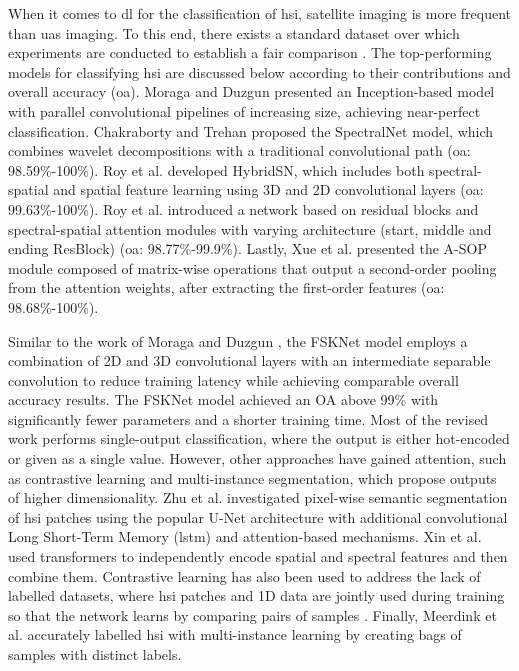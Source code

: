 When it comes to \acrshort{dl} for the classification of \acrshort{hsi}, satellite imaging is more frequent than \acrshort{uas} imaging. To this end, there exists a standard dataset over which experiments are conducted to establish a fair comparison \cite{m_grana_hyperspectral_nodate}. The top-performing models for classifying \acrshort{hsi} are discussed below according to their contributions and overall accuracy (\acrshort{oa}). Moraga and Duzgun \cite{moraga_jigsawhsi_2022} presented an Inception-based model with parallel convolutional pipelines of increasing size, achieving near-perfect classification. Chakraborty and Trehan \cite{chakraborty_spectralnet_2021} proposed the SpectralNet model, which combines wavelet decompositions with a traditional convolutional path (\acrshort{oa}: 98.59\%-100\%). Roy et al. \cite{roy_hybridsn_2020} developed HybridSN, which includes both spectral-spatial and spatial feature learning using 3D and 2D convolutional layers (\acrshort{oa}: 99.63\%-100\%). Roy et al. \cite{roy_attention-based_2021} introduced a network based on residual blocks and spectral-spatial attention modules with varying architecture (start, middle and ending ResBlock) (\acrshort{oa}: 98.77\%-99.9\%). Lastly, Xue et al. \cite{xue_attention-based_2021} presented the A-SOP module composed of matrix-wise operations that output a second-order pooling from the attention weights, after extracting the first-order features (\acrshort{oa}: 98.68\%-100\%). 

Similar to the work of Moraga and Duzgun \cite{moraga_jigsawhsi_2022}, the FSKNet model employs a combination of 2D and 3D convolutional layers with an intermediate separable convolution to reduce training latency while achieving comparable overall accuracy results. The FSKNet model achieved an OA above 99\% with significantly fewer parameters and a shorter training time. Most of the revised work performs single-output classification, where the output is either hot-encoded or given as a single value. However, other approaches have gained attention, such as contrastive learning and multi-instance segmentation, which propose outputs of higher dimensionality. Zhu et al. \cite{zhu_spectral-spatial-dependent_2021} investigated pixel-wise semantic segmentation of \acrshort{hsi} patches using the popular U-Net architecture with additional convolutional Long Short-Term Memory (\acrshort{lstm}) and attention-based mechanisms. Xin et al. \cite{xin_convolution_2022} used transformers to independently encode spatial and spectral features and then combine them. Contrastive learning has also been used to address the lack of labelled datasets, where \acrshort{hsi} patches and 1D data are jointly used during training so that the network learns by comparing pairs of samples \cite{guan_spatial-spectral_2022}. Finally, Meerdink et al. \cite{meerdink_multitarget_2022} accurately labelled \acrshort{hsi} with multi-instance learning by creating bags of samples with distinct labels.

